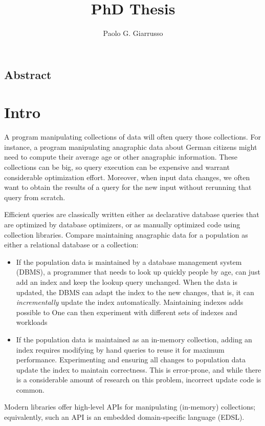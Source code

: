 \documentclass{book}
\title{PhD Thesis}
\author{Paolo G. Giarrusso}
\begin{document}
\maketitle
\section*{Abstract}

\chapter{Intro}

A program manipulating collections of data will often query those collections.
For instance, a program manipulating anagraphic data about German citizens might
need to compute their average age or other anagraphic information. These
collections can be big, so query execution can be expensive and warrant
considerable optimization effort. Moreover, when input data changes, we often
want to obtain the results of a query for the new input without rerunning that
query from scratch.

Efficient queries are classically written either as declarative database queries that are
optimized by database optimizers, or as manually optimized code using
collection libraries. Compare maintaining anagraphic data for a population
as either a relational database or a collection:
\begin{itemize}
\item If the population data is maintained by a database management system
  (DBMS), a programmer that needs to look up quickly people by age, can just add
  an index and keep the lookup query unchanged. When the data is updated, the
  DBMS can adapt the index to the new changes, that is, it can \emph{incrementally} update the
  index automatically.
  Maintaining indexes adds possible to
  One can then experiment with different sets of indexes and workloads
\item If the population data is maintained as an in-memory collection, adding an
  index requires modifying by hand queries to reuse it for maximum performance.
  Experimenting and ensuring all changes to population data update the index to
  maintain correctness. This is error-prone, and while there is a considerable
  amount of research on this problem, incorrect update code is common.
\end{itemize}
Modern libraries offer high-level APIs for manipulating (in-memory) collections;
equivalently, such an API is an embedded domain-specific language (EDSL).
\end{document}
